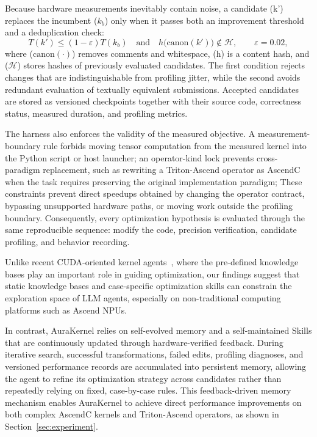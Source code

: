 Because hardware measurements inevitably contain noise, a candidate (k') replaces the incumbent ($k_b$) only when it passes both an improvement threshold and a deduplication check:
\begin{equation}
T(k')\le(1-\varepsilon)T(k_b)
\quad\text{and}\quad
h\big(\mathrm{canon}(k')\big)\notin\mathcal{H},
\qquad \varepsilon=0.02,
\end{equation}
where ($\mathrm{canon}(\cdot)$) removes comments and whitespace, (h) is a content hash, and ($\mathcal{H}$) stores hashes of previously evaluated candidates. The first condition rejects changes that are indistinguishable from profiling jitter, while the second avoids redundant evaluation of textually equivalent submissions. Accepted candidates are stored as versioned checkpoints together with their source code, correctness status, measured duration, and profiling metrics.

The harness also enforces the validity of the measured objective. A measurement-boundary rule forbids moving tensor computation from the measured kernel into the Python script or host launcher; an operator-kind lock prevents cross-paradigm replacement, such as rewriting a Triton-Ascend operator as AscendC when the task requires preserving the original implementation paradigm; These constraints prevent direct speedups obtained by changing the operator contract, bypassing unsupported hardware paths, or moving work outside the profiling boundary. Consequently, every optimization hypothesis is evaluated through the same reproducible sequence: modify the code, precision verification, candidate profiling, and behavior recording.

Unlike recent CUDA-oriented kernel agents~\citep{chen2026avo,mit_han_lab_kernel_design_agents_2026}, where the pre-defined knowledge bases play an important role in guiding optimization, our findings suggest that static knowledge bases and case-specific optimization skills can constrain the exploration space of LLM agents, especially on non-traditional computing platforms such as Ascend NPUs. 

In contrast, AuraKernel relies on self-evolved memory and a self-maintained Skills that are continuously updated through hardware-verified feedback. During iterative search, successful transformations, failed edits, profiling diagnoses, and versioned performance records are accumulated into persistent memory, allowing the agent to refine its optimization strategy across candidates rather than repeatedly relying on fixed, case-by-case rules. This feedback-driven memory mechanism enables AuraKernel to achieve direct performance improvements on both complex AscendC kernels and Triton-Ascend operators, as shown in Section~\ref{sec:experiment}.


